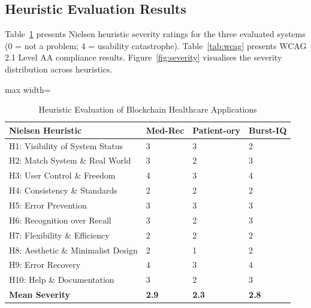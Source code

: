 \documentclass[journal,onecolumn]{IEEEtran}
\begin{document}
\subsection{Heuristic Evaluation Results}

Table~\ref{tab:heuristic} presents Nielsen heuristic severity ratings for the three evaluated systems (0 = not a problem; 4 = usability catastrophe). Table~\ref{tab:wcag} presents WCAG 2.1 Level AA compliance results. Figure~\ref{fig:severity} visualises the severity distribution across heuristics.

\begin{table}[htbp]
\caption{Heuristic Evaluation of Blockchain Healthcare Applications}
\label{tab:heuristic}
\begin{center}
\small
\begin{adjustbox}{max width=\columnwidth}
\begin{tabular}{|p{2.8cm}|p{0.7cm}|p{0.8cm}|p{0.7cm}|}
\hline
\textbf{Nielsen Heuristic} & \textbf{Med-Rec} & \textbf{Patient-ory} & \textbf{Burst-IQ} \\
\hline
H1: Visibility of System Status & 3 & 3 & 2 \\
\hline
H2: Match System \& Real World & 3 & 2 & 3 \\
\hline
H3: User Control \& Freedom & 4 & 3 & 4 \\
\hline
H4: Consistency \& Standards & 2 & 2 & 2 \\
\hline
H5: Error Prevention & 3 & 3 & 3 \\
\hline
H6: Recognition over Recall & 3 & 2 & 3 \\
\hline
H7: Flexibility \& Efficiency & 2 & 2 & 2 \\
\hline
H8: Aesthetic \& Minimalist Design & 2 & 1 & 2 \\
\hline
H9: Error Recovery & 4 & 3 & 4 \\
\hline
H10: Help \& Documentation & 3 & 2 & 3 \\
\hline
\textbf{Mean Severity} & \textbf{2.9} & \textbf{2.3} & \textbf{2.8} \\
\hline
\end{tabular}
\end{adjustbox}
\end{center}
\end{table}
\end{document}
